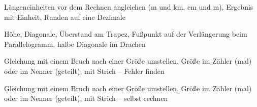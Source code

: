 \begin{aufgabe}{Längeneinheiten vor dem Rechnen angleichen (m und km, cm und m), Ergebnis mit Einheit, Runden auf eine Dezimale}
\end{aufgabe}

\begin{aufgabe}{Höhe, Diagonale, Überstand am Trapez, Fußpunkt auf der Verlängerung beim Parallelogramm, halbe Diagonale im Drachen}
\end{aufgabe}

\begin{aufgabe}{Gleichung mit einem Bruch nach einer Größe umstellen, Größe im Zähler (mal) oder im Nenner (geteilt), mit Strich – Fehler finden}
\end{aufgabe}

\begin{aufgabe}{Gleichung mit einem Bruch nach einer Größe umstellen, Größe im Zähler (mal) oder im Nenner (geteilt), mit Strich – selbst rechnen}
\end{aufgabe}
